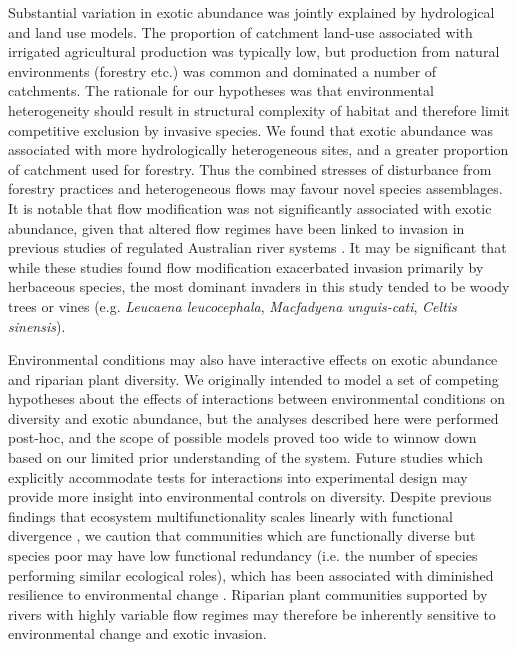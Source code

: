\documentclass[openright,12pt,a4paper]{memoir}
\begin{document}
Substantial variation in exotic abundance was jointly explained by hydrological and land use models. The proportion of catchment land-use associated with irrigated agricultural production was typically low, but production from natural environments (forestry etc.) was common and dominated a number of catchments. The rationale for our hypotheses was that environmental heterogeneity should result in structural complexity of habitat and therefore limit competitive exclusion by invasive species. We found that exotic abundance was associated with more hydrologically heterogeneous sites, and a greater proportion of catchment used for forestry. Thus the combined stresses of disturbance from forestry practices and heterogeneous flows may favour novel species assemblages. It is notable that flow modification was not significantly associated with exotic abundance, given that altered flow regimes have been linked to invasion in previous studies of regulated Australian river systems \citep{Catford2011, Greet2012c}. It may be significant that while these studies found flow modification exacerbated invasion primarily by herbaceous species, the most dominant invaders in this study tended to be woody trees or vines (e.g. \textit{Leucaena leucocephala}, \textit{Macfadyena unguis-cati}, \textit{Celtis sinensis}).

Environmental conditions may also have interactive effects on exotic abundance and riparian plant diversity. We originally intended to model a set of competing hypotheses about the effects of interactions between environmental conditions on diversity and exotic abundance, but the analyses described here were performed post-hoc, and the scope of possible models proved too wide to winnow down based on our limited prior understanding of the system. Future studies which explicitly accommodate tests for interactions into experimental design may provide more insight into environmental controls on diversity.
Despite previous findings that ecosystem multifunctionality scales linearly with functional divergence \citep{Mouillot2011}, we caution that communities which are functionally diverse but species poor may have low functional redundancy (i.e. the number of species performing similar ecological roles), which has been associated with diminished resilience to environmental change \citep{Laliberte2010}. Riparian plant communities supported by rivers with highly variable flow regimes may therefore be inherently sensitive to environmental change and exotic invasion. 
\end{document}
